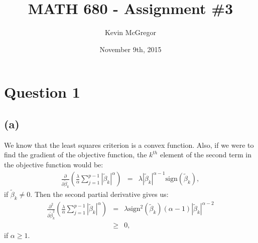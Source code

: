 \documentclass{article}\usepackage[]{graphicx}\usepackage[]{color}
\title{MATH 680 - Assignment \#3}
\author{Kevin McGregor}
\date{November 9th, 2015}
\begin{document}
\maketitle

\newcommand{\tb}{\tilde{\beta}}
\newcommand{\sign}{\mbox{sign}}

\section*{Question 1}
\subsection*{(a)}
We know that the least squares criterion is a convex function.  Also, if we were to find the gradient of the objective function, the $k^{th}$ element of the second term in the objective function would be:
\begin{eqnarray*}
  \frac{\partial}{\partial\tb_k} \left( \frac{\lambda}{\alpha} \sum_{j=1}^{p-1} |\tb_k|^\alpha \right) &=& \lambda |\tb_k|^{\alpha-1}\sign(\tb_k),
\end{eqnarray*}
if $\tb_k \neq 0$.  Then the second partial derivative gives us:
\begin{eqnarray*}
  \frac{\partial^2}{\partial\tb_k^2} \left( \frac{\lambda}{\alpha} \sum_{j=1}^{p-1} |\tb_k|^\alpha \right) &=& \lambda \sign^2(\tb_k)(\alpha-1) |\tb_k|^{\alpha-2} \\
        &\geq& 0,
\end{eqnarray*}
if $\alpha \geq 1$.
\end{document}
